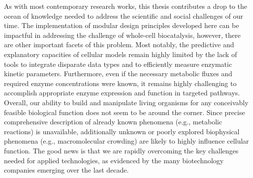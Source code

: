 
As with most contemporary research works, this thesis contributes a drop to the ocean of knowledge needed to address the scientific and social challenges of our time.
The implementation of modular design principles developed here can be impactful in addressing the challenge of whole-cell biocatalysis, however, there are other important facets of this problem.
Most notably, the predictive and explanatory capacities of cellular models remain highly limited by the lack of tools to integrate disparate data types and to efficiently measure enzymatic kinetic parameters.
Furthermore, even if the necessary metabolic fluxes and required enzyme concentrations were known, it remains highly challenging to accomplish appropriate enzyme expression and function in targeted pathways. %
Overall, our ability to build and manipulate living organisms for any conceivably feasible biological function does not seem to be around the corner.
Since precise comprehensive description of already known phenomena (e.g., metabolic reactions) is unavailable, additionally unknown or poorly explored biophysical phenomena (e.g., macromolecular crowding) are likely to highly influence cellular function.
The good news is that we are rapidly overcoming the key challenges needed for applied technologies, as evidenced by the many biotechnology companies emerging over the last decade.

